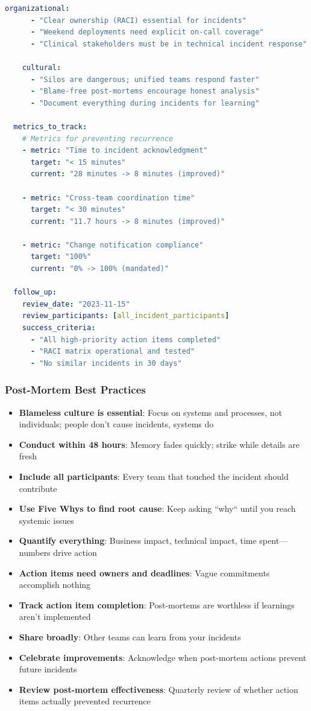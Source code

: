 \begin{lstlisting}[language=yaml, caption={Structured Post-Mortem Template}]
    organizational:
      - "Clear ownership (RACI) essential for incidents"
      - "Weekend deployments need explicit on-call coverage"
      - "Clinical stakeholders must be in technical incident response"

    cultural:
      - "Silos are dangerous; unified teams respond faster"
      - "Blame-free post-mortems encourage honest analysis"
      - "Document everything during incidents for learning"

  metrics_to_track:
    # Metrics for preventing recurrence
    - metric: "Time to incident acknowledgment"
      target: "< 15 minutes"
      current: "28 minutes -> 8 minutes (improved)"

    - metric: "Cross-team coordination time"
      target: "< 30 minutes"
      current: "11.7 hours -> 8 minutes (improved)"

    - metric: "Change notification compliance"
      target: "100%"
      current: "0% -> 100% (mandated)"

  follow_up:
    review_date: "2023-11-15"
    review_participants: [all_incident_participants]
    success_criteria:
      - "All high-priority action items completed"
      - "RACI matrix operational and tested"
      - "No similar incidents in 30 days"
\end{lstlisting}

\subsubsection{Post-Mortem Best Practices}

\begin{itemize}
    \item \textbf{Blameless culture is essential}: Focus on systems and processes, not individuals; people don't cause incidents, systems do
    \item \textbf{Conduct within 48 hours}: Memory fades quickly; strike while details are fresh
    \item \textbf{Include all participants}: Every team that touched the incident should contribute
    \item \textbf{Use Five Whys to find root cause}: Keep asking ``why`` until you reach systemic issues
    \item \textbf{Quantify everything}: Business impact, technical impact, time spent---numbers drive action
    \item \textbf{Action items need owners and deadlines}: Vague commitments accomplish nothing
    \item \textbf{Track action item completion}: Post-mortems are worthless if learnings aren't implemented
    \item \textbf{Share broadly}: Other teams can learn from your incidents
    \item \textbf{Celebrate improvements}: Acknowledge when post-mortem actions prevent future incidents
    \item \textbf{Review post-mortem effectiveness}: Quarterly review of whether action items actually prevented recurrence
\end{itemize}

